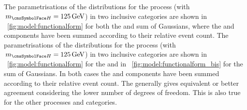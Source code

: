 \ifNewAnalysis
The parametrisations of the \mgg distributions for the \ggH process (with $\mH=125\GeV$) in two inclusive categories are shown in \Fig~\ref{fig:model:functionalform} for both the \DCBpG and sum of Gaussians, where the \RV and \WV components have been summed according to their relative event count. %
\else
The parametrisations of the \mgg distributions for the \ggH process (with $\mH=125\GeV$) in two inclusive categories are shown in \Fig~\ref{fig:model:functionalform} for the \DCBpG and in \Fig~\ref{fig:model:functionalform_bis} for the sum of Gaussians. In both cases the \RV and \WV components have been summed according to their relative event count. %
\fi
The \DCBpG generally gives equivalent or better agreement considering the lower number of degrees of freedom. This is also true for the other processes and categories.

